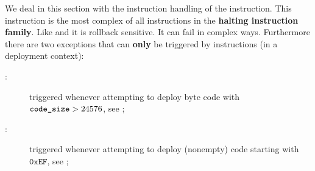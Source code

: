 We deal in this section with the instruction handling of the  instruction.
This instruction is the most complex of all instructions in the \textbf{halting instruction family}.
Like  and  it is rollback sensitive.
It can fail in complex ways.
Furthermore there are two exceptions that can \textbf{only} be triggered by  instructions (in a deployment context):
\begin{description}
	\item[\maxcsxSH{}:]
		triggered whenever attempting to deploy byte code with $ \texttt{code\_size} > 24576 $,
		see \cite{EIP-170};
	\item[\icpxSH{}:]
		triggered whenever attempting to deploy (nonempty) code starting with $\texttt{0xEF}$,
		see \cite{EIP-3541};
\end{description}
